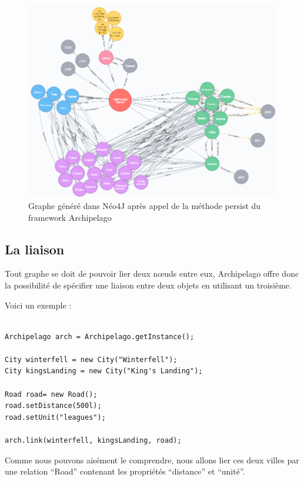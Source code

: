 \documentclass[a4paper,fleqn,12pt]{report}
\begin{document}
\begin{figure}[!ht]
\centering
\includegraphics[scale=0.53]{figures/ecoleNeo4J.png}
\caption{Graphe généré dans Néo4J après appel de la méthode persist du framework Archipelago}
\label{fig:ecoleNeo4J}
\end{figure}

\subsection{La liaison}

Tout graphe se doit de pouvoir lier deux nœuds entre eux, Archipelago offre donc la possibilité de spécifier une liaison entre deux objets en utilisant un troisième. 

Voici un exemple : 

\begin{lstlisting}

Archipelago arch = Archipelago.getInstance();

City winterfell = new City("Winterfell");
City kingsLanding = new City("King's Landing");

Road road= new Road();
road.setDistance(500l);
road.setUnit("leagues");
        
arch.link(winterfell, kingsLanding, road);

\end{lstlisting}

Comme nous pouvons aisément le comprendre, nous allons lier ces deux villes par une relation \enquote{Road} contenant les propriétés \enquote{distance} et \enquote{unité}.
\end{document}
